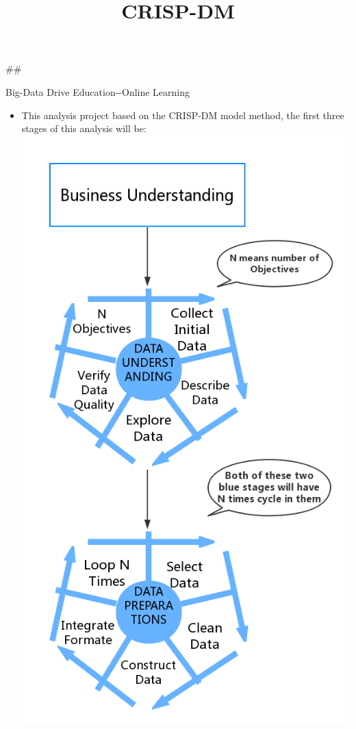 \documentclass[11pt]{article}
\title{CRISP-DM}
\makeatletter
\def\maxwidth{\ifdim\Gin@nat@width>\linewidth\linewidth
    \else\Gin@nat@width\fi}
\let\Oldincludegraphics\includegraphics
\renewcommand{\includegraphics}[1]{\Oldincludegraphics[width=.8\maxwidth]{#1}}
\providecommand{\tightlist}{%
      \setlength{\itemsep}{0pt}\setlength{\parskip}{0pt}}
\makeatother
\begin{document}
    
    
    \maketitle
    
    

    
    \#\#

Big-Data Drive Education-\/-Online Learning

    \begin{itemize}
\tightlist
\item
  This analysis project based on the CRISP-DM model method, the first
  three stages of this analysis will be: \includegraphics{myloop.png}
\end{itemize}
\end{document}
